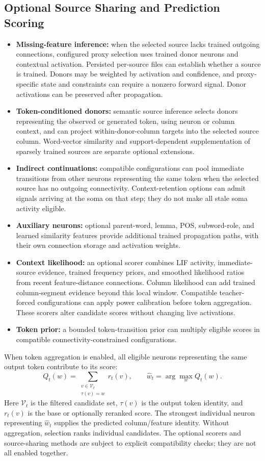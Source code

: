 \subsection{Optional Source Sharing and Prediction Scoring}
\begin{itemize}
	\item \textbf{Missing-feature inference:} when the selected source lacks trained outgoing connections, configured proxy selection uses trained donor neurons and contextual activation. Persisted per-source files can establish whether a source is trained. Donors may be weighted by activation and confidence, and proxy-specific state and constraints can require a nonzero forward signal. Donor activations can be preserved after propagation.
	\item \textbf{Token-conditioned donors:} semantic source inference selects donors representing the observed or generated token, using neuron or column context, and can project within-donor-column targets into the selected source column. Word-vector similarity and support-dependent supplementation of sparsely trained sources are separate optional extensions.
	\item \textbf{Indirect continuations:} compatible configurations can pool immediate transitions from other neurons representing the same token when the selected source has no outgoing connectivity. Context-retention options can admit signals arriving at the soma on that step; they do not make all stale soma activity eligible.
	\item \textbf{Auxiliary neurons:} optional parent-word, lemma, POS, subword-role, and learned similarity features provide additional trained propagation paths, with their own connection storage and activation weights.
	\item \textbf{Context likelihood:} an optional scorer combines LIF activity, immediate-source evidence, trained frequency priors, and smoothed likelihood ratios from recent feature-distance connections. Column likelihood can add trained column-segment evidence beyond this local window. Compatible teacher-forced configurations can apply power calibration before token aggregation. These scorers alter candidate scores without changing live activations.
	\item \textbf{Token prior:} a bounded token-transition prior can multiply eligible scores in compatible connectivity-constrained configurations.
\end{itemize}

When token aggregation is enabled, all eligible neurons representing the same output token contribute to its score:
\[
	Q_t(w)=\sum_{\substack{v\in\mathcal{V}_t\\\tau(v)=w}}r_t(v), \qquad \hat w_t=\arg\max_w Q_t(w).
\]
Here $\mathcal{V}_t$ is the filtered candidate set, $\tau(v)$ is the output token identity, and $r_t(v)$ is the base or optionally reranked score. The strongest individual neuron representing $\hat w_t$ supplies the predicted column/feature identity. Without aggregation, selection ranks individual candidates. The optional scorers and source-sharing methods are subject to explicit compatibility checks; they are not all enabled together.

